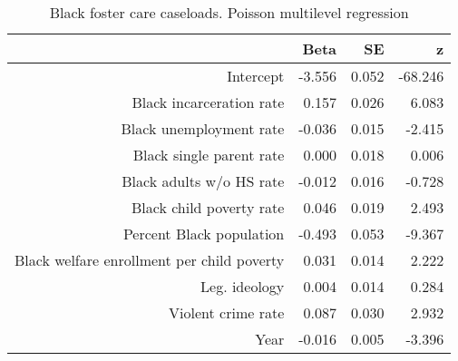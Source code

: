 \begin{table}[ht]
\centering
\begin{tabular}{rrrr}
  \hline
 & Beta & SE & z \\ 
  \hline
Intercept & -3.556 & 0.052 & -68.246 \\ 
  Black incarceration rate & 0.157 & 0.026 & 6.083 \\ 
  Black unemployment rate & -0.036 & 0.015 & -2.415 \\ 
  Black single parent rate & 0.000 & 0.018 & 0.006 \\ 
  Black adults w/o HS rate & -0.012 & 0.016 & -0.728 \\ 
  Black child poverty rate & 0.046 & 0.019 & 2.493 \\ 
  Percent Black population & -0.493 & 0.053 & -9.367 \\ 
  Black welfare enrollment per child poverty & 0.031 & 0.014 & 2.222 \\ 
  Leg. ideology & 0.004 & 0.014 & 0.284 \\ 
  Violent crime rate & 0.087 & 0.030 & 2.932 \\ 
  Year & -0.016 & 0.005 & -3.396 \\ 
   \hline
\end{tabular}
\caption{Black foster care caseloads. Poisson multilevel regression} 
\label{b.c.tab}
\end{table}

